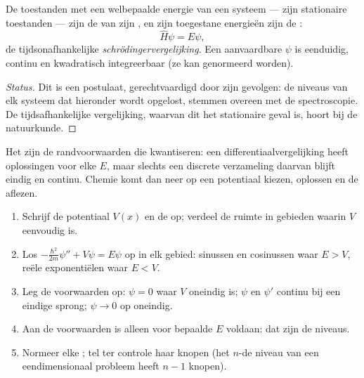 \begin{theorem}[De schrödingervergelijking]\label{thm:b3:quantum-model-systems:schrodinger}
De toestanden met een welbepaalde energie van een systeem --- zijn
stationaire toestanden --- zijn de  van zijn ,
en zijn toegestane energieën zijn de :
\[
\hat H\psi = E\psi,
\]
de tijdsonafhankelijke
\emph{schrödingervergelijking}.
Een aanvaardbare $\psi$ is eenduidig, continu en kwadratisch integreerbaar
(ze kan genormeerd worden).
\end{theorem}
\begin{proof}[Status]
Dit is een postulaat, gerechtvaardigd door zijn gevolgen: de niveaus van
elk systeem dat hieronder wordt opgelost, stemmen overeen met de
spectroscopie. De tijdsafhankelijke vergelijking, waarvan dit het
stationaire geval is, hoort bij de natuurkunde.
\end{proof}

Het zijn de randvoorwaarden die kwantiseren: een differentiaalvergelijking
heeft oplossingen voor elke $E$, maar slechts een discrete verzameling
daarvan blijft eindig en continu. Chemie komt dan neer op een potentiaal
kiezen, oplossen en de  aflezen.

\begin{method}\label{met:b3:quantum-model-systems:one-dimensional}
\begin{enumerate}
  \item Schrijf de potentiaal $V(x)$ en de  op; verdeel de
        ruimte in gebieden waarin $V$ eenvoudig is.
  \item Los $-\frac{\hbar^2}{2m}\psi'' + V\psi = E\psi$ op in elk gebied: sinussen
        en cosinussen waar $E > V$, reële exponentiëlen waar $E < V$.
  \item Leg de voorwaarden op: $\psi = 0$ waar $V$ oneindig is; $\psi$
        en $\psi'$ continu bij een eindige sprong; $\psi \to 0$ op oneindig.
  \item Aan de voorwaarden is alleen voor bepaalde $E$ voldaan: dat zijn de
        niveaus.
  \item Normeer elke ; tel ter controle haar knopen (het
        $n$-de niveau van een eendimensionaal probleem heeft $n - 1$ knopen).
\end{enumerate}
\end{method}


